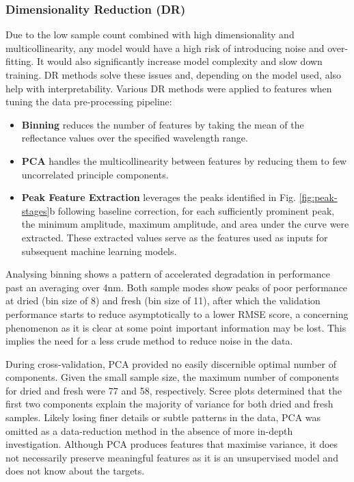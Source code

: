 \documentclass[conference]{IEEEtran}
\begin{document}
\subsubsection{Dimensionality Reduction (DR)}
Due to the low sample count combined with high dimensionality and multicollinearity, any model would have a high risk of introducing noise and over-fitting. It would also significantly increase model complexity and slow down training. DR methods solve these issues and, depending on the model used, also help with interpretability. Various DR methods were applied to features when tuning the data pre-processing pipeline:
\begin{itemize}
    \item \textbf{Binning} reduces the number of features by taking the mean of the reflectance values over the specified wavelength range.
    \item \textbf{PCA} handles the multicollinearity between features by reducing them to few uncorrelated principle components.
    \item \textbf{Peak Feature Extraction} leverages the peaks identified in Fig. \ref{fig:peak-stages}b following baseline correction, for each sufficiently prominent peak, the minimum amplitude, maximum amplitude, and area under the curve were extracted. These extracted values serve as the features used as inputs for subsequent machine learning models.
\end{itemize}
Analysing binning shows a pattern of accelerated degradation in performance past an averaging over 4nm. Both sample modes show peaks of poor performance at dried (bin size of 8) and fresh (bin size of 11), after which the validation performance starts to reduce asymptotically to a lower RMSE score, a concerning phenomenon as it is clear at some point important information may be lost. This implies the need for a less crude method to reduce noise in the data.

During cross-validation, PCA provided no easily discernible optimal number of components. Given the small sample size, the maximum number of components for dried and fresh were 77 and 58, respectively. Scree plots determined that the first two components explain the majority of variance for both dried and fresh samples. Likely losing finer details or subtle patterns in the data, PCA was omitted as a data-reduction method in the absence of more in-depth investigation. Although PCA produces features that maximise variance, it does not necessarily preserve meaningful features as it is an unsupervised model and does not know about the targets.
\end{document}
